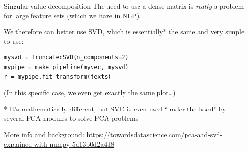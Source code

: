 \documentclass[compress]{beamer}
\begin{document}
\begin{frame}[fragile]{Singular value decomposition}
The need to use a dense matrix is \emph{really} a problem for large feature sets (which we have in NLP).
\pause

We therefore can better use SVD, which is essentially* the same and very simple to use:

\begin{lstlisting}
mysvd = TruncatedSVD(n_components=2)
mypipe = make_pipeline(myvec, mysvd)
r = mypipe.fit_transform(texts)
\end{lstlisting}

\footnotesize{(In this specific case, we even get exactly the same plot\ldots)}


\footnotesize{
* It's mathematically different, but SVD is even used ``under the hood'' by several PCA modules to solve PCA problems.

More info and background: \url{https://towardsdatascience.com/pca-and-svd-explained-with-numpy-5d13b0d2a4d8}}

\end{frame}


%
%
%
%
%
%
%
\end{document}
